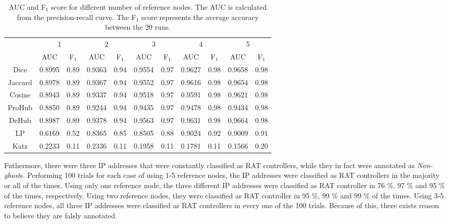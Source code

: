 \begin{table}[h!]
    \centering
    \caption{AUC and F$_1$ score for different number of reference nodes. The AUC is calculated from the precision-recall curve. The F$_1$ score represents the average accuracy between the 20 runs.}
    \begin{tabular}{|c||c|c||c|c||c|c||c|c||c|c|}
      \hline
      \multirow{2}{*}{~} 
            & \multicolumn{2}{c||}{1}
            & \multicolumn{2}{c||}{2}
            & \multicolumn{2}{c||}{3}
            & \multicolumn{2}{c||}{4}
            & \multicolumn{2}{|c|}{5} \\             \cline{2-11}
      ~     &AUC&F$_1$&AUC&F$_1$&AUC&F$_1$&AUC&F$_1$&AUC&F$_1$ \\ \hline
    Dice    &0.8995 & 0.89 & 0.9363 &0.94 &0.9554&0.97 & 0.9627 &0.98&0.9658 & 0.98 \\
    Jaccard &0.8978 & 0.89 & 0.9367 &0.94 &0.9552&0.97 & 0.9616 &0.98&0.9654 & 0.98 \\
    Cosine  &0.8943 & 0.89 & 0.9337 &0.94 &0.9518&0.97 & 0.9591 &0.98&0.9621 & 0.98 \\
    ProHub  &0.8850 & 0.89 & 0.9244 &0.94 &0.9435&0.97 & 0.9478 &0.98&0.9434 & 0.98 \\
    DeHub   &0.8987 & 0.89 & 0.9378 &0.94 &0.9563&0.97 & 0.9631 &0.98&0.9664 & 0.98 \\
    LP      &0.6169 & 0.52 & 0.8365 & 0.85 & 0.8505 & 0.88 & 0.9024 & 0.92 & 0.9009 & 0.91 \\ 
    Katz    &0.2233 & 0.11 & 0.2336 & 0.11 & 0.1958 & 0.11 & 0.1781 & 0.11 & 0.1566 & 0.20 \\ \hline
    \end{tabular}
    \label{aucIndex}
\end{table}

Futhermore, there were three IP addresses that were constantly classified as RAT controllers, while they in fact were annotated as \textit{Non-ghost}s. Performing 100 trials for each case of using 1-5 reference nodes, the IP addresses were classified as RAT controllers in the majority or all of the times. Using only one reference node, the three different IP addresses were classified as RAT controller in 76 \%, 97 \% and 95 \% of the times, respectively. Using two reference nodes, they were classified as RAT controller in 95 \%, 99 \% and 99 \% of the times. Using 3-5 reference nodes, all three IP addresses were classified as RAT controllers in every one of the 100 trials. Because of this, there exists reason to believe they are falsly annotated. 

